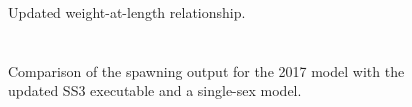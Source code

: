 \documentclass[
]{scrartcl}
\begin{document}
\begin{figure}


\caption{\label{fig-LWrel}Updated weight-at-length relationship.}

\end{figure}%

\section{}\label{section}

\begin{figure}


\caption{\label{fig-ss3exe_1}Comparison of the spawning output for the
2017 model with the updated SS3 executable and a single-sex model.}

\end{figure}%
\end{document}
